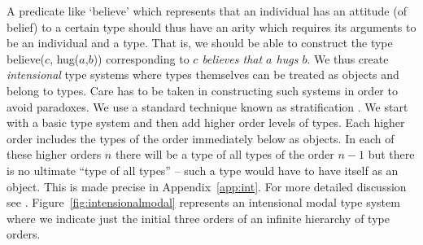 A predicate like `believe' which represents that an individual has an
attitude (of belief) to a certain type should thus have an arity which
requires its arguments to be an individual and a type.  That is, we
should be able to construct the type believe($c$, hug($a$,$b$))
corresponding to \textit{$c$ believes that $a$ hugs $b$}.  We thus
create \textit{intensional} type systems where types themselves can be treated
as objects and belong to types.  Care has to be taken in constructing
such systems in order to avoid paradoxes.  We use a standard
technique known as stratification \cite{Turner2005}.  We start with a
basic type system and then add higher order levels of types.  Each
higher order includes the types of the order immediately below as
objects.  In each of these higher orders $n$ there will be a type of
all types of the order $n-1$ but there is no ultimate ``type of all
types'' -- such a type would have to have itself as an object.  This
is made precise in Appendix~\ref{app:int}.  For more detailed
discussion see \cite{Cooperforthcoming}.  
Figure~\ref{fig:intensionalmodal} represents an intensional modal type
system where we indicate just the initial
three orders of an infinite hierarchy of type orders.
